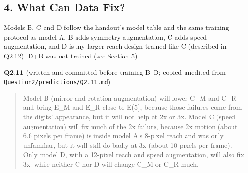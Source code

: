 \documentclass[11pt,a4paper]{article}
\begin{document}
\subsection*{4. What Can Data Fix?}

Models B, C and D follow the handout's model table and the same training protocol as model A. B adds symmetry augmentation, C adds speed augmentation, and D is my larger-reach design trained like C (described in Q2.12). D+B was not trained (see Section 5).

\textbf{Q2.11} (written and committed before training B--D; copied unedited from \nolinkurl{Question2/predictions/Q2.11.md})

\begin{quote}\small
Model B (mirror and rotation augmentation) will lower C\_M and C\_R and bring E\_M and E\_R close to E(5), because those failures come from the digits' appearance, but it will not help at 2x or 3x. Model C (speed augmentation) will fix much of the 2x failure, because 2x motion (about 6.6 pixels per frame) is inside model A's 8-pixel reach and was only unfamiliar, but it will still do badly at 3x (about 10 pixels per frame). Only model D, with a 12-pixel reach and speed augmentation, will also fix 3x, while neither C nor D will change C\_M or C\_R much.
\end{quote}

\begin{table}[H]
  \centering
  \caption{Models A--D on the test set ($t=1$). Training time is the mean over 30 epochs; inference time covers all 1,000 original test videos at batch size 32.}
  \resizebox{\textwidth}{!}{}
\end{table}
\end{document}
